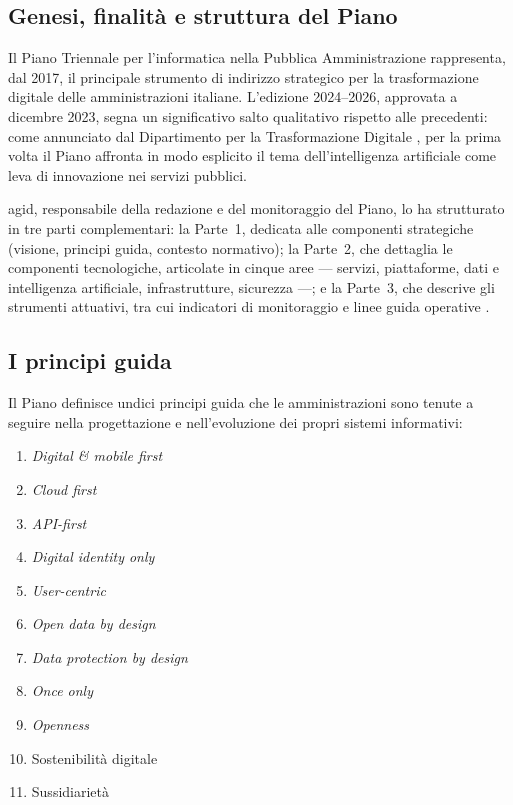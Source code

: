 \subsection{Genesi, finalità e struttura del Piano}

Il Piano Triennale per l'informatica nella Pubblica Amministrazione rappresenta, dal 2017, il principale strumento di indirizzo strategico per la trasformazione digitale delle amministrazioni italiane. L'edizione 2024--2026, approvata a dicembre 2023, segna un significativo salto qualitativo rispetto alle precedenti: come annunciato dal Dipartimento per la Trasformazione Digitale \parencite{InnovGovPianoTriennale}, per la prima volta il Piano affronta in modo esplicito il tema dell'intelligenza artificiale come leva di innovazione nei servizi pubblici.

\gls{agid}, responsabile della redazione e del monitoraggio del Piano, lo ha strutturato in tre parti complementari: la Parte~1, dedicata alle componenti strategiche (visione, principi guida, contesto normativo); la Parte~2, che dettaglia le componenti tecnologiche, articolate in cinque aree --- servizi, piattaforme, dati e intelligenza artificiale, infrastrutture, sicurezza ---; e la Parte~3, che descrive gli strumenti attuativi, tra cui indicatori di monitoraggio e linee guida operative \parencite{AgIDPianoTriennale2024}.

\subsection{I principi guida}

Il Piano definisce undici principi guida che le amministrazioni sono tenute a seguire nella progettazione e nell'evoluzione dei propri sistemi informativi:

\begin{enumerate}[label=\arabic*., noitemsep]
  \item \textit{Digital \& mobile first}
  \item \textit{Cloud first}
  \item \textit{API-first}
  \item \textit{Digital identity only}
  \item \textit{User-centric}
  \item \textit{Open data by design}
  \item \textit{Data protection by design}
  \item \textit{Once only}
  \item \textit{Openness}
  \item Sostenibilità digitale
  \item Sussidiarietà
\end{enumerate}

